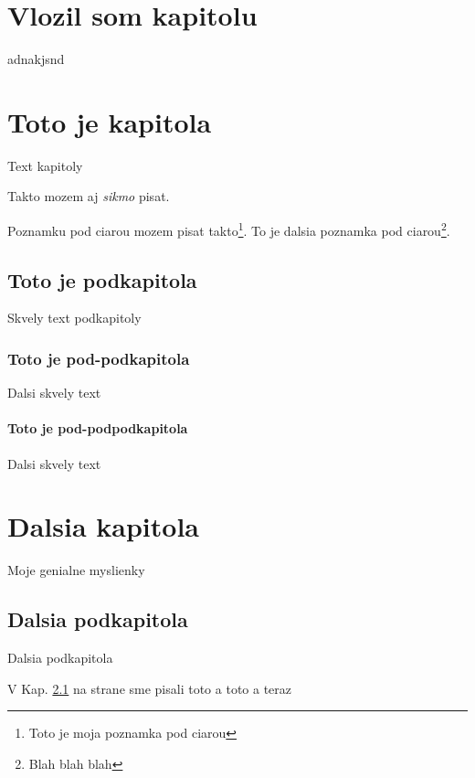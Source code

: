 
\chapter{Vlozil som kapitolu}

adnakjsnd

\chapter{Toto je kapitola}
Text kapitoly

Takto mozem aj \emph{sikmo} pisat.

Poznamku pod ciarou mozem pisat takto\footnote{Toto je moja poznamka pod ciarou}. To je dalsia poznamka pod ciarou\footnote{Blah blah blah}.

\section{Toto je podkapitola}
\label{mojapodkapitola}
Skvely text podkapitoly

\subsection{Toto je pod-podkapitola}
Dalsi skvely text

\subsubsection{Toto je pod-podpodkapitola}
Dalsi skvely text

\chapter{Dalsia kapitola}

Moje genialne myslienky

\section{Dalsia podkapitola}

Dalsia podkapitola

V Kap. \ref{mojapodkapitola} na strane \pageref{mojapodkapitola} sme pisali toto a toto a teraz 